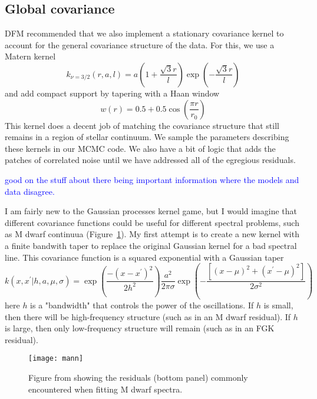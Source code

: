 \documentclass[preprint]{aastex} %
\newcommand{\hcom}[1]{ \textcolor{Blue}{#1}}
\begin{document}
\subsection{Global covariance}
DFM recommended that we also implement a stationary covariance kernel to account for the general covariance structure of the data. For this, we use a Matern kernel 
\begin{equation}
  k_{\nu = 3/2}(r, a, l) = a \left(1 + \frac{\sqrt{3} r}{l} \right ) \exp \left (- \frac{\sqrt{3} r}{l} \right ) 
\end{equation}
and add compact support by tapering with a Haan window
\begin{equation}
  w(r) = 0.5 + 0.5 \cos \left( \frac{\pi r}{r_0} \right)
\end{equation}
This kernel does a decent job of matching the covariance structure that still remains in a region of stellar continuum. We sample the parameters describing these kernels in our MCMC code. We also have a bit of logic that adds the patches of correlated noise until we have addressed all of the egregious residuals.

\hcom{good on the stuff about there being important information where the models and data disagree.}

I am fairly new to the Gaussian processes kernel game, but I would imagine that different covariance functions could be useful for different spectral problems, such as M dwarf continuua (Figure~\ref{fig:mann}). My first attempt is to create a new kernel with a finite bandwith taper to replace the original Gaussian kernel for a bad spectral line. This covariance function is a squared exponential with a Gaussian taper
\begin{equation}
k(x, x^\prime | h, a, \mu, \sigma) = \exp \left ( \frac{-( x - x^\prime)^2 }{2 h^2} \right ) \frac{a^2}{2 \pi \sigma} \exp \left ( - \frac{[(x - \mu)^2 + (x^\prime - \mu)^2]}{2 \sigma^2}\right )
\end{equation}
here $h$ is a "bandwidth" that controls the power of the oscillations. If $h$ is small, then there will be high-frequency structure (such as in an M dwarf residual). If $h$ is large, then only low-frequency structure will remain (such as in an FGK residual).

\begin{figure}[!htb]
\begin{center}
\texttt{[image: mann]}
\caption{Figure from \citet{mga13} showing the residuals (bottom panel) commonly encountered when fitting M dwarf spectra.}
\label{fig:mann}
\end{center}
\end{figure}
\end{document}
